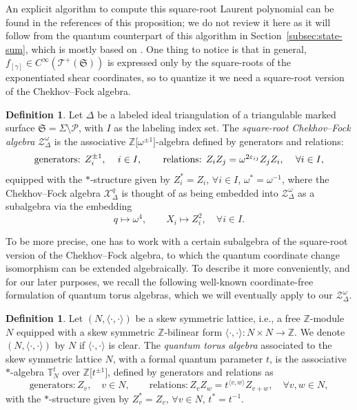 \documentclass[10pt,a4paper]{amsart}
\numberwithin{equation}{section}
\theoremstyle{definition}
\newtheorem{Definition}[Theorem]{Definition}
\begin{document}
An explicit algorithm to compute this square-root Laurent polynomial can be found in the references of this proposition; we do not review it here as it will follow from the quantum counterpart of this algorithm in Section~\ref{subsec:state-sum}, which is mostly based on \cite{BW}.
One thing to notice is that in general, $f_{[\gamma]} \in C^\infty(\mathscr{T}^+(\mathfrak{S}))$ is expressed only by the square-roots of the exponentiated shear coordinates, so to quantize it we need a square-root version of the Chekhov--Fock algebra.
\begin{Definition}
Let $\Delta$ be a labeled ideal triangulation of a triangulable marked surface $\mathfrak{S} = \Sigma\setminus\mathcal{P}$, with $I$ as the labeling index set.
The {\em square-root Chekhov--Fock algebra} $\mathcal{Z}^\omega_\Delta$ is the associative $\mathbb{Z}\bigl[\omega^{\pm 1}\bigr]$-algebra defined by generators and relations:
\[
\mbox{generators: $Z_i^{\pm 1}$, \quad $i \in I$, \qquad relations: $Z_i Z_j = \omega^{2\varepsilon_{ij}} Z_j Z_i$, \quad $\forall i \in I$},
\]
equipped with the $*$-structure given by $Z_i^* = Z_i$, $\forall i \in I$, $\omega^* = \omega^{-1}$, where the Chekhov--Fock algebra $\mathcal{X}^q_\Delta$ is thought of as being embedded into $\mathcal{Z}^\omega_\Delta$ as a subalgebra via the embedding
\[
q \mapsto \omega^4, \qquad
X_i \mapsto Z_i^2, \quad \forall i \in I.
\]
\end{Definition}
To be more precise, one has to work with a certain subalgebra of the square-root version of the Chekhov--Fock algebra, to which the quantum coordinate change isomorphism can be extended algebraically. To describe it more conveniently, and for our later purposes, we recall the following well-known coordinate-free formulation of quantum torus algebras, which we will eventually apply to our $\mathcal{Z}^\omega_\Delta$.
\begin{Definition}
\label{def:QT}
Let $(N,\langle \cdot,\cdot\rangle)$ be a skew symmetric lattice, i.e., a free $\mathbb{Z}$-module $N$ equipped with a skew symmetric $\mathbb{Z}$-bilinear form $\langle \cdot, \cdot \rangle \colon N \times N \to \mathbb{Z}$. We denote $(N,\langle \cdot,\cdot\rangle)$ by $N$ if $\langle \cdot,\cdot\rangle$ is clear. The {\em quantum torus algebra} associated to the skew symmetric lattice $N$, with a formal quantum parameter $t$, is the associative $*$-algebra $\mathbb{T}^t_N$ over $\mathbb{Z}\bigl[t^{\pm 1}\bigr]$, defined by generators and relations as
\[
\mbox{generators}: Z_v, \quad v \in N, \qquad
\mbox{relations}: Z_v Z_w = t^{\langle v,w\rangle} Z_{v+w},\quad \forall v,w\in N,
\]
with the $*$-structure given by $Z_v^*=Z_v$, $\forall v\in N$, $t^* = t^{-1}$.
\end{Definition}
\end{document}
